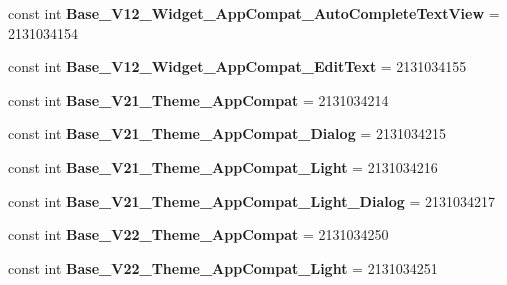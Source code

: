 \begin{DoxyCompactItemize}
\item 
\hypertarget{classClient_1_1Droid_1_1Resource_1_1Style_a25ecaee34b36d7fdca7f8aba334fb647}{}const int {\bfseries Base\+\_\+\+V12\+\_\+\+Widget\+\_\+\+App\+Compat\+\_\+\+Auto\+Complete\+Text\+View} = 2131034154\label{classClient_1_1Droid_1_1Resource_1_1Style_a25ecaee34b36d7fdca7f8aba334fb647}

\item 
\hypertarget{classClient_1_1Droid_1_1Resource_1_1Style_acbec68d77d33ec4ab5ee1a92d117b1ec}{}const int {\bfseries Base\+\_\+\+V12\+\_\+\+Widget\+\_\+\+App\+Compat\+\_\+\+Edit\+Text} = 2131034155\label{classClient_1_1Droid_1_1Resource_1_1Style_acbec68d77d33ec4ab5ee1a92d117b1ec}

\item 
\hypertarget{classClient_1_1Droid_1_1Resource_1_1Style_afa1499bf41825cabebaa3c1b88f2eaa8}{}const int {\bfseries Base\+\_\+\+V21\+\_\+\+Theme\+\_\+\+App\+Compat} = 2131034214\label{classClient_1_1Droid_1_1Resource_1_1Style_afa1499bf41825cabebaa3c1b88f2eaa8}

\item 
\hypertarget{classClient_1_1Droid_1_1Resource_1_1Style_a5ae34bd49dabfbdaf972f13aa720ea98}{}const int {\bfseries Base\+\_\+\+V21\+\_\+\+Theme\+\_\+\+App\+Compat\+\_\+\+Dialog} = 2131034215\label{classClient_1_1Droid_1_1Resource_1_1Style_a5ae34bd49dabfbdaf972f13aa720ea98}

\item 
\hypertarget{classClient_1_1Droid_1_1Resource_1_1Style_a9df698185e7d1e3af858d07455e4605d}{}const int {\bfseries Base\+\_\+\+V21\+\_\+\+Theme\+\_\+\+App\+Compat\+\_\+\+Light} = 2131034216\label{classClient_1_1Droid_1_1Resource_1_1Style_a9df698185e7d1e3af858d07455e4605d}

\item 
\hypertarget{classClient_1_1Droid_1_1Resource_1_1Style_adc6c8e24018c27e417d798216b640cc7}{}const int {\bfseries Base\+\_\+\+V21\+\_\+\+Theme\+\_\+\+App\+Compat\+\_\+\+Light\+\_\+\+Dialog} = 2131034217\label{classClient_1_1Droid_1_1Resource_1_1Style_adc6c8e24018c27e417d798216b640cc7}

\item 
\hypertarget{classClient_1_1Droid_1_1Resource_1_1Style_aa50565cf6a566b7c86a44f65d3210c05}{}const int {\bfseries Base\+\_\+\+V22\+\_\+\+Theme\+\_\+\+App\+Compat} = 2131034250\label{classClient_1_1Droid_1_1Resource_1_1Style_aa50565cf6a566b7c86a44f65d3210c05}

\item 
\hypertarget{classClient_1_1Droid_1_1Resource_1_1Style_a41e9721e710aa7ff2eadf6bf849a2702}{}const int {\bfseries Base\+\_\+\+V22\+\_\+\+Theme\+\_\+\+App\+Compat\+\_\+\+Light} = 2131034251\label{classClient_1_1Droid_1_1Resource_1_1Style_a41e9721e710aa7ff2eadf6bf849a2702}


\end{DoxyCompactItemize}
